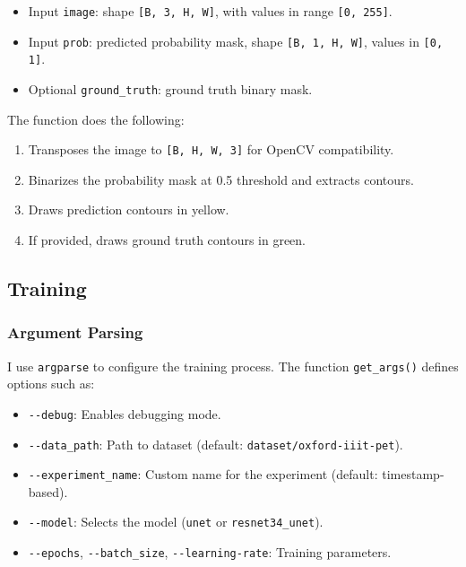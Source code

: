 \documentclass{homework}
\begin{document}
\begin{itemize}
    \item Input \lstinline{image}: shape \lstinline{[B, 3, H, W]}, with values in range \lstinline{[0, 255]}.
    \item Input \lstinline{prob}: predicted probability mask, shape \lstinline{[B, 1, H, W]}, values in \lstinline{[0, 1]}.
    \item Optional \lstinline{ground_truth}: ground truth binary mask.
\end{itemize}

The function does the following:

\begin{enumerate}
    \item Transposes the image to \lstinline{[B, H, W, 3]} for OpenCV compatibility.
    \item Binarizes the probability mask at 0.5 threshold and extracts contours.
    \item Draws prediction contours in yellow.
    \item If provided, draws ground truth contours in green.
\end{enumerate}

\subsection{Training}

\subsubsection{Argument Parsing}
I use \lstinline{argparse} to configure the training process. The function \lstinline{get_args()} defines options such as:

\begin{itemize}
    \item \lstinline{--debug}: Enables debugging mode.
    \item \lstinline{--data_path}: Path to dataset (default: \lstinline{dataset/oxford-iiit-pet}).
    \item \lstinline{--experiment_name}: Custom name for the experiment (default: timestamp-based).
    \item \lstinline{--model}: Selects the model (\lstinline{unet} or \lstinline{resnet34_unet}).
    \item \lstinline{--epochs}, \lstinline{--batch_size}, \lstinline{--learning-rate}: Training parameters.
\end{itemize}
\end{document}
